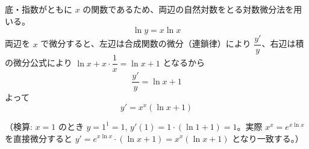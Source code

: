 
底・指数がともに $x$ の関数であるため、両辺の自然対数をとる対数微分法を用いる。
\[
\ln y = x\ln x
\]
両辺を $x$ で微分すると、左辺は合成関数の微分（連鎖律）により $\dfrac{y'}{y}$、右辺は積の微分公式により $\ln x + x\cdot\dfrac{1}{x} = \ln x + 1$ となるから
\[
\frac{y'}{y} = \ln x + 1
\]
よって
\[
\boxed{\; y' = x^{x}(\ln x + 1) \;}
\]

（検算: $x=1$ のとき $y=1^{1}=1$, $y'(1) = 1\cdot(\ln 1 + 1) = 1$。実際 $x^{x} = e^{x\ln x}$ を直接微分すると
$y' = e^{x\ln x}\cdot(\ln x + 1) = x^{x}(\ln x+1)$ となり一致する。）
